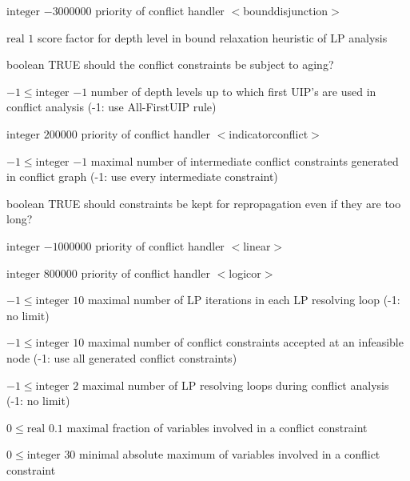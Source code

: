 %
{$\textrm{integer}$}%
{$-3000000$}%
{priority of conflict handler $<$bounddisjunction$>$}%
{}

%
{$\textrm{real}$}%
{$1$}%
{score factor for depth level in bound relaxation heuristic of LP analysis}%
{}

%
{boolean}%
{TRUE}%
{should the conflict constraints be subject to aging?}%
{}

%
{$-1\leq\textrm{integer}$}%
{$-1$}%
{number of depth levels up to which first UIP's are used in conflict analysis (-1: use All-FirstUIP rule)}%
{}

%
{$\textrm{integer}$}%
{$200000$}%
{priority of conflict handler $<$indicatorconflict$>$}%
{}

%
{$-1\leq\textrm{integer}$}%
{$-1$}%
{maximal number of intermediate conflict constraints generated in conflict graph (-1: use every intermediate constraint)}%
{}

%
{boolean}%
{TRUE}%
{should constraints be kept for repropagation even if they are too long?}%
{}

%
{$\textrm{integer}$}%
{$-1000000$}%
{priority of conflict handler $<$linear$>$}%
{}

%
{$\textrm{integer}$}%
{$800000$}%
{priority of conflict handler $<$logicor$>$}%
{}

%
{$-1\leq\textrm{integer}$}%
{$10$}%
{maximal number of LP iterations in each LP resolving loop (-1: no limit)}%
{}

%
{$-1\leq\textrm{integer}$}%
{$10$}%
{maximal number of conflict constraints accepted at an infeasible node (-1: use all generated conflict constraints)}%
{}

%
{$-1\leq\textrm{integer}$}%
{$2$}%
{maximal number of LP resolving loops during conflict analysis (-1: no limit)}%
{}

%
{$0\leq\textrm{real}$}%
{$0.1$}%
{maximal fraction of variables involved in a conflict constraint}%
{}

%
{$0\leq\textrm{integer}$}%
{$30$}%
{minimal absolute maximum of variables involved in a conflict constraint}%
{}

